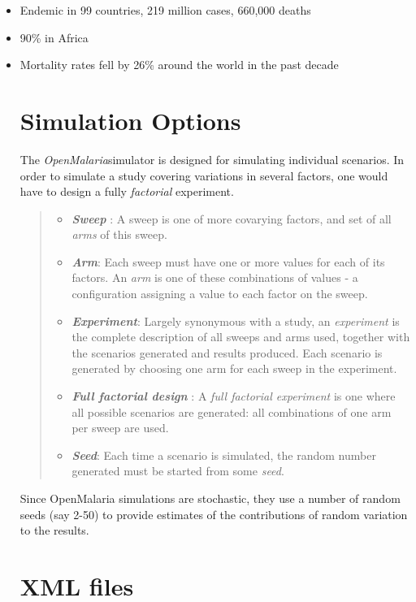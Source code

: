\documentclass[]{scrartcl}
\newcommand{\om}{\textit{OpenMalaria}}
\begin{document}
\begin{itemize}
\item Endemic in 99 countries, 219 million cases, 660,000 deaths 
\item 90\% in Africa
\item Mortality rates fell by 26\% around the world in the past decade

\section{Simulation Options}

The \om simulator is designed for simulating individual scenarios. 
In order to simulate a study covering variations in several factors, one 
would have to  design a fully \textit{factorial} experiment.

\begin{quote}
	\begin{itemize}
		\item \textbf{\textit{Sweep}} : A sweep is one of more covarying factors, and set of all \textit{arms} of this sweep.
		\item \textbf{\textit{Arm}}: Each sweep must have one or more values for each of its factors. An \textit{arm} 
		is one of these combinations of values - a configuration assigning a value to each factor on the sweep. 
		\item \textbf{\textit{Experiment}}: Largely synonymous with a study, an \textit{experiment} is the complete
		description of all sweeps and arms used, together with the scenarios generated and results produced. Each scenario is generated by choosing
		one arm for each sweep in the experiment. 
		\item \textbf{\textit{Full factorial design}} : A \textit{full factorial experiment} is one where all possible scenarios are generated: all
		combinations of one arm per sweep are used.
		\item \textbf{\textit{Seed}}: Each time a scenario is simulated, the random number generated must be started from some \textit{seed}.
	\end{itemize}
\end{quote}


Since OpenMalaria simulations are stochastic, they use a number of random seeds (say 2-50) 
to provide estimates of the contributions of random variation to the results.

\section{XML files}


\end{itemize}
\end{document}

